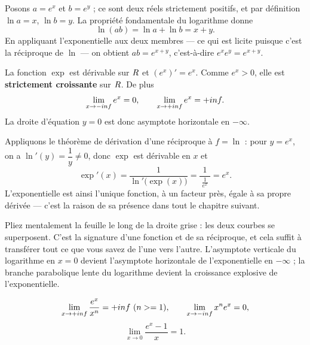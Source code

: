 \begin{demonstration}[de la relation $e^{x+y} = e^{x}e^{y}$]
Posons $a = e^{x}$ et $b = e^{y}$ ; ce sont deux réels strictement positifs, et
par définition $\ln a = x$, $\ln b = y$. La propriété fondamentale du
logarithme donne
\[
  \ln(ab) = \ln a + \ln b = x+y .
\]
En appliquant l'exponentielle aux deux membres — ce qui est licite puisque
c'est la réciproque de $\ln$ — on obtient $ab = e^{x+y}$, c'est-à-dire
$e^{x}e^{y} = e^{x+y}$.
\end{demonstration}

\begin{propriete}
La fonction $\exp$ est dérivable sur $R$ et $\left(e^{x}\right)' = e^{x}$.
Comme $e^{x}>0$, elle est \textbf{strictement croissante} sur $R$. De plus
\[
  \limminf e^{x} = 0, \qquad \limpinf e^{x} = +\infty .
\]
La droite d'équation $y = 0$ est donc asymptote horizontale en $-\infty$.
\end{propriete}

\begin{demonstration}[de la dérivée]
Appliquons le théorème de dérivation d'une réciproque à $f = \ln$ : pour
$y = e^{x}$, on a $\ln'(y) = \dfrac{1}{y} \neq 0$, donc $\exp$ est dérivable
en $x$ et
\[
  \exp'(x) = \frac{1}{\ln'\bigl(\exp(x)\bigr)} = \frac{1}{\ \frac{1}{e^{x}}\ } = e^{x}.
\]
L'exponentielle est ainsi l'unique fonction, à un facteur près, égale à sa
propre dérivée — c'est la raison de sa présence dans tout le chapitre suivant.
\end{demonstration}

\begin{visualisation}
\begin{center}

\end{center}

Pliez mentalement la feuille le long de la droite grise : les deux courbes se
superposent. C'est la signature d'une fonction et de sa réciproque, et cela
suffit à transférer tout ce que vous savez de l'une vers l'autre.
L'asymptote verticale du logarithme en $x=0$ devient l'asymptote horizontale
de l'exponentielle en $-\infty$ ; la branche parabolique lente du logarithme
devient la croissance explosive de l'exponentielle.
\end{visualisation}

\begin{theoreme}
\[
  \limpinf \frac{e^{x}}{x^{n}} = +\infty \ (n \geq 1), \qquad
  \limminf x^{n}e^{x} = 0,
\]
\[
  \lim_{x \to 0}\frac{e^{x}-1}{x} = 1 .
\]
\end{theoreme}

